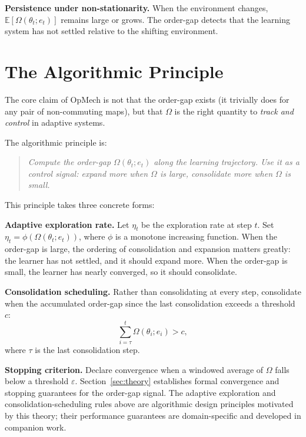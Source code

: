 \documentclass[12pt,a4paper]{article}
\newcommand{\Ogap}{\Omega}
\begin{document}
\textbf{Persistence under non-stationarity.}
When the environment changes, $\mathbb{E}[\Ogap(\theta_t; e_t)]$ remains
large or grows. The order-gap detects that the learning system has not settled
relative to the shifting environment.

\section{The Algorithmic Principle}
\label{sec:principle}

The core claim of OpMech is not that the order-gap exists (it trivially does
for any pair of non-commuting maps), but that $\Ogap$ is the right
quantity to \emph{track and control} in adaptive systems.

The algorithmic principle is:

\begin{quote}
\emph{Compute the order-gap $\Ogap(\theta_t; e_t)$ along the learning
trajectory. Use it as a control signal: expand more when $\Ogap$ is large,
consolidate more when $\Ogap$ is small.}
\end{quote}

This principle takes three concrete forms:

\textbf{Adaptive exploration rate.}
Let $\eta_t$ be the exploration rate at step $t$. Set
$\eta_t = \phi(\Ogap(\theta_t; e_t))$, where $\phi$ is a monotone increasing
function. When the order-gap is large, the ordering of consolidation and
expansion matters greatly: the learner has not settled, and it should expand
more. When the order-gap is small, the learner has nearly converged, so it
should consolidate.

\textbf{Consolidation scheduling.}
Rather than consolidating at every step, consolidate when the accumulated
order-gap since the last consolidation exceeds a threshold $c$:
\[
\sum_{i=\tau}^{t} \Ogap(\theta_i; e_i) > c,
\]
where $\tau$ is the last consolidation step.

\textbf{Stopping criterion.}
Declare convergence when a windowed average of $\Ogap$ falls below a
threshold $\varepsilon$. Section~\ref{sec:theory} establishes formal
convergence and stopping guarantees for the order-gap signal. The adaptive
exploration and consolidation-scheduling rules above are algorithmic design
principles motivated by this theory; their performance guarantees are
domain-specific and developed in companion work.

\end{document}
